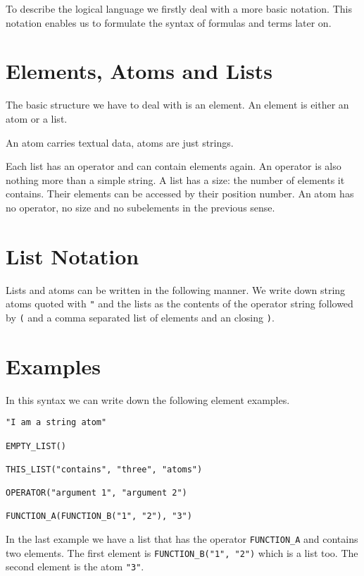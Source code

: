 \documentclass[a4paper,german,10pt,twoside]{book}
\theoremstyle{definition}
\theoremstyle{remark}
\begin{document}
To describe the logical language we firstly deal with a more basic notation. This notation enables us to formulate the syntax of formulas and terms later on.

\section{Elements, Atoms and Lists} \label{chapter2_section1} \hypertarget{chapter2_section1}{}
The basic structure we have to deal with is an element. An element is either an atom or a list. 

\par
An atom carries textual data, atoms are just strings.      

\par
Each list has an operator and can contain elements again. An operator is also nothing more than a simple string. A list has a size: the number of elements it contains.  Their elements can be accessed by their position number. An atom has no operator, no size and no subelements in the previous sense.

\section{List Notation} \label{chapter2_section2} \hypertarget{chapter2_section2}{}
Lists and atoms can be written in the following manner.
We write down string atoms quoted with {\tt "} and the lists as the contents of the operator string followed by {\tt (} and a comma separated list of elements and an closing {\tt )}.

\section{Examples} \label{chapter2_section3} \hypertarget{chapter2_section3}{}
In this syntax we can write down the following element examples.

\begin{verbatim}
"I am a string atom"

EMPTY_LIST()

THIS_LIST("contains", "three", "atoms")

OPERATOR("argument 1", "argument 2")

FUNCTION_A(FUNCTION_B("1", "2"), "3")
\end{verbatim}

In the last example we have a list that has the operator \verb#FUNCTION_A# and contains two elements. The first element is \verb#FUNCTION_B("1", "2")# which is a list too. The second element is the atom \verb#"3"#.
\end{document}
